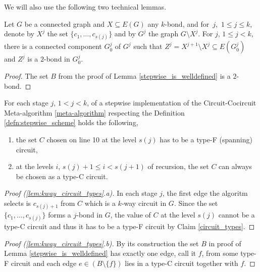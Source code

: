 \noindent We will also use the following two technical lemmas.

\begin{lem}
	\label{stepwise_2bond}
	Let $G$ be a connected graph and $X \subseteq E(G)$ any $k$-bond, and for~$j$,~$1 \leq j \leq k$, denote by $X^j$ the set $\{c_1,\ldots,c_{s(j)}\}$ and by $G^j$ the graph $G \setminus X^{j}$. For $j$, $1 \leq j < k$, there is a connected component $G_0^j$ of $G^j$ such that $Z^j = X^{j+1} \setminus X^{j} \subseteq E(G_0^j)$ and $Z^j$ is a $2$-bond in $G_0^j$.
\end{lem}

\begin{proof}
	The set $B$ from the proof of Lemma \ref{stepwise_is_welldefined} is a $2$-bond.
\end{proof}


\begin{lem}
	\label{lem:kway_circuit_types}
	For each stage $j$, $1 < j < k$, of a stepwise implementation of the Circuit-Cocircuit Meta-algorithm \ref{meta-algorithm} respecting the Definition \ref{defn:stepwise_scheme} holds the following,

	\begin{enumerate}[label=\alph*.]
		\item the set $C$ chosen on line 10 at the level $s(j)$ has to be a type-F (spanning) circuit,
		\item at the levels $i$, $s(j)+1 \leq i < s(j+1)$ of recursion, the set $C$ can always be chosen as a type-C circuit.
	\end{enumerate}
\end{lem}

\begin{proof}[Proof (\ref{lem:kway_circuit_types}.a)]
	In each stage $j$, the first edge the algoritm selects is $c_{s(j)+1}$ from $C$ which is a $k$-way circuit in $G$. Since the set $\{c_1,\ldots,c_{s(j)}\}$ forms a $j$-bond in $G$, the value of $C$ at the level $s(j)$ cannot be a type-C circuit and thus it has to be a type-F circuit by Claim \ref{circuit_types}.
\end{proof}

\begin{proof}[Proof (\ref{lem:kway_circuit_types}.b)]
	By its construction the set $B$ in proof of Lemma \ref{stepwise_is_welldefined} has exactly one edge, call it $f$, from some type-F circuit and each edge $e \in (B \setminus \{f\})$ lies in a type-C circuit together with $f$.
\end{proof}

